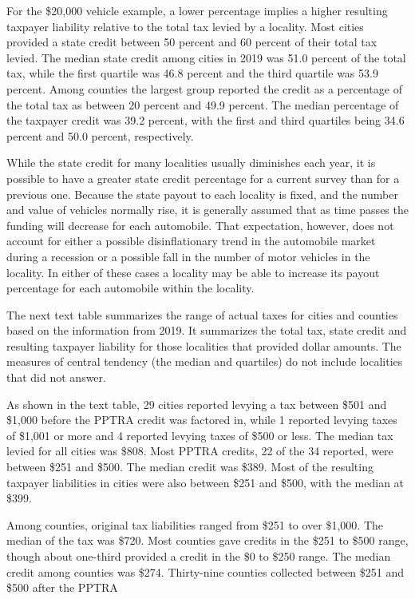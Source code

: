 \documentclass[
]{book}
\begin{document}
For the \$20,000 vehicle example, a lower percentage implies a higher resulting taxpayer liability relative to the total tax levied by a locality. Most cities provided a state credit between 50 percent and 60 percent of their total tax levied. The median state credit among cities in 2019 was 51.0 percent of the total tax, while the first quartile was 46.8 percent and the third quartile was 53.9 percent. Among counties the largest group reported the credit as a percentage of the total tax as between 20 percent and 49.9 percent. The median percentage of the taxpayer credit was 39.2 percent, with the first and third quartiles being 34.6 percent and 50.0 percent, respectively.

While the state credit for many localities usually diminishes each year, it is possible to have a greater state credit percentage for a current survey than for a previous one. Because the state payout to each locality is fixed, and the number and value of vehicles normally rise, it is generally assumed that as time passes the funding will decrease for each automobile. That expectation, however, does not account for either a possible disinflationary trend in the automobile market during a recession or a possible fall in the number of motor vehicles in the locality. In either of these cases a locality may be able to increase its payout percentage for each automobile within the locality.

The next text table summarizes the range of actual taxes for cities and counties based on the information from 2019. It summarizes the total tax, state credit and resulting taxpayer liability for those localities that provided dollar amounts. The measures of central tendency (the median and quartiles) do not include localities that did not answer.

As shown in the text table, 29 cities reported levying a tax between \$501 and \$1,000 before the PPTRA credit was factored in, while 1 reported levying taxes of \$1,001 or more and 4 reported levying taxes of \$500 or less. The median tax levied for all cities was \$808. Most PPTRA credits, 22 of the 34 reported, were between \$251 and \$500. The median credit was \$389. Most of the resulting taxpayer liabilities in cities were also between \$251 and \$500, with the median at \$399.

Among counties, original tax liabilities ranged from \$251 to over \$1,000. The median of the tax was \$720. Most counties gave credits in the \$251 to \$500 range, though about one-third provided a credit in the \$0 to \$250 range. The median credit among counties was \$274. Thirty-nine counties collected between \$251 and \$500 after the PPTRA
\end{document}
